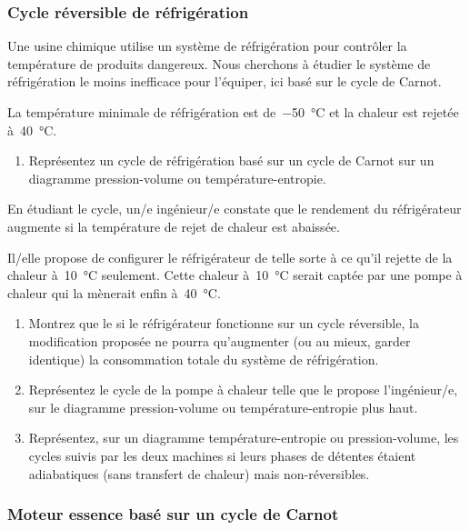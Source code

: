 \subsubsection{Cycle réversible de réfrigération}

	\wherefrom{[DS n°2 2012, 7pts]}

	Une usine chimique utilise un système de réfrigération pour contrôler la température de produits dangereux. Nous cherchons à étudier le système de réfrigération le moins inefficace pour l’équiper, ici basé sur le cycle de Carnot.
	
	La température minimale de réfrigération est de~\SI{-50}{\degreeCelsius} et la chaleur est rejetée à~\SI{40}{\degreeCelsius}.
	
		\begin{enumerate}
			\item Représentez un cycle de réfrigération basé sur un cycle de Carnot sur un diagramme pression-volume ou température-entropie.
		\end{enumerate}
		
	En étudiant le cycle, un/e ingénieur/e constate que le rendement du réfrigérateur augmente si la température de rejet de chaleur est abaissée.
	
	Il/elle propose de configurer le réfrigérateur de telle sorte à ce qu’il rejette de la chaleur à~\SI{10}{\degreeCelsius} seulement. Cette chaleur à~\SI{10}{\degreeCelsius} serait captée par une pompe à chaleur qui la mènerait enfin à~\SI{40}{\degreeCelsius}. 
	
		\begin{enumerate}
			\item Montrez que le si le réfrigérateur fonctionne sur un cycle réversible, la modification proposée ne pourra qu’augmenter (ou au mieux, garder identique) la consommation totale du système de réfrigération.
			\item Représentez le cycle de la pompe à chaleur telle que le propose l’ingénieur/e, sur le diagramme pression-volume ou température-entropie plus haut.
			\item Représentez, sur un diagramme température-entropie ou pression-volume, les cycles suivis par les deux machines si leurs phases de détentes étaient adiabatiques (sans transfert de chaleur) mais non-réversibles.
		\end{enumerate}
		

\subsubsection{Moteur essence basé sur un cycle de Carnot}

